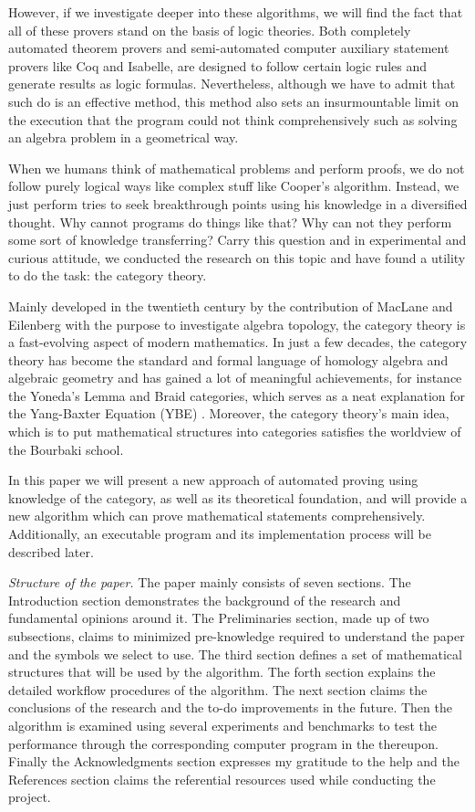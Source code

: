 \documentclass{aims}
\numberwithin{equation}{section}
\numberwithin{theorem}{section}	%
\numberwithin{axiom}{section}	%
\numberwithin{definition}{section}	%
\begin{document}
	However, if we investigate deeper into these algorithms, we will find the fact that all of these provers stand on the basis of logic theories. Both completely automated theorem provers and semi-automated computer auxiliary statement provers like Coq and Isabelle, are designed to follow certain logic rules and generate results as logic formulas. Nevertheless, although we have to admit that such do is an effective method, this method also sets an insurmountable limit on the execution that the program could not think comprehensively such as solving an algebra problem in a geometrical way.
	
	When we humans think of mathematical problems and perform proofs, we do not follow purely logical ways like complex stuff like Cooper{'}s algorithm. Instead, we just perform tries to seek breakthrough points using his knowledge in a diversified thought. Why cannot programs do things like that? Why can not they perform some sort of knowledge transferring? Carry this question and in experimental and curious attitude, we conducted the research on this topic and have found a utility to do the task: the category theory.
	
	Mainly developed in the twentieth century by the contribution of MacLane and Eilenberg with the purpose to investigate algebra topology, the category theory is a fast-evolving aspect of modern mathematics. In just a few decades, the category theory has become the standard and formal language of homology algebra and algebraic geometry and has gained a lot of meaningful achievements, for instance the Yoneda{'}s Lemma and Braid categories, which serves as a neat explanation for the Yang-Baxter Equation (YBE) \cite{Li2019}. Moreover, the category theory{'}s main idea, which is to put mathematical structures into categories satisfies the worldview of the Bourbaki school.
	
	In this paper we will present a new approach of automated proving using knowledge of the category, as well as its theoretical foundation, and will provide a new algorithm which can prove mathematical statements comprehensively. Additionally, an executable program and its implementation process will be described later.
	
	\textit{ Structure of the paper.}\newline
	The paper mainly consists of seven sections. The Introduction section demonstrates the background of the research and fundamental opinions around it. The Preliminaries section, made up of two subsections, claims to minimized pre-knowledge required to understand the paper and the symbols we select to use. The third section defines a set of mathematical structures that will be used by the algorithm. The forth section explains the detailed workflow procedures of the algorithm. The next section claims the conclusions of the research and the to-do improvements in the future. Then the algorithm is examined using several experiments and benchmarks to test the performance through the corresponding computer program in the thereupon. Finally the Acknowledgments section expresses my gratitude to the help and the References section claims the referential resources used while conducting the project.
	
\end{document}

